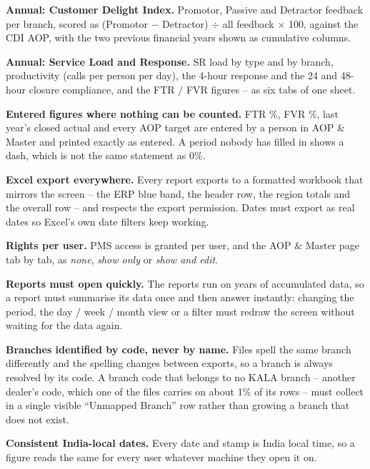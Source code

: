 \documentclass[11pt,a4paper]{article}
\newcommand{\qt}[1]{\textquotedblleft #1\textquotedblright}
\begin{document}
\begin{reqlist}
\item \textbf{Annual: Customer Delight Index.} Promotor, Passive and Detractor feedback
per branch, scored as (Promotor $-$ Detractor) $\div$ all feedback $\times$ 100, against
the CDI AOP, with the two previous financial years shown as cumulative columns.

\item \textbf{Annual: Service Load and Response.} SR load by type and by branch,
productivity (calls per person per day), the 4-hour response and the 24 and 48-hour
closure compliance, and the FTR / FVR figures -- as six tabs of one sheet.

\item \textbf{Entered figures where nothing can be counted.} FTR \%, FVR \%, last year's
closed actual and every AOP target are entered by a person in AOP \& Master and printed
exactly as entered. A period nobody has filled in shows a dash, which is not the same
statement as 0\%.

\item \textbf{Excel export everywhere.} Every report exports to a formatted workbook that
mirrors the screen -- the ERP blue band, the header row, the region totals and the
overall row -- and respects the export permission. Dates must export as real dates so
Excel's own date filters keep working.

\item \textbf{Rights per user.} PMS access is granted per user, and the AOP \& Master page
tab by tab, as \emph{none}, \emph{show only} or \emph{show and edit}.

\item \textbf{Reports must open quickly.} The reports run on years of accumulated data,
so a report must summarise its data once and then answer instantly: changing the period,
the day / week / month view or a filter must redraw the screen without waiting for the
data again.

\item \textbf{Branches identified by code, never by name.} Files spell the same branch
differently and the spelling changes between exports, so a branch is always resolved by
its code. A branch code that belongs to no KALA branch -- another dealer's code, which
one of the files carries on about 1\% of its rows -- must collect in a single visible
\qt{Unmapped Branch} row rather than growing a branch that does not exist.

\item \textbf{Consistent India-local dates.} Every date and stamp is India local time, so
a figure reads the same for every user whatever machine they open it on.

\end{reqlist}
\end{document}
